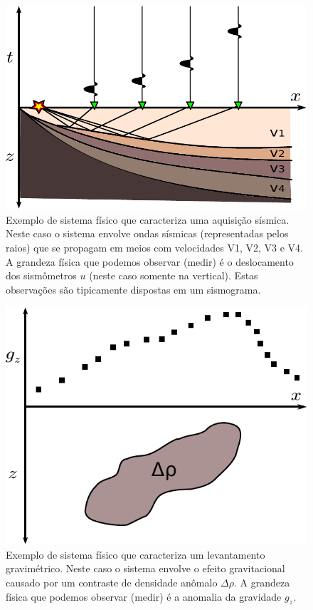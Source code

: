 \begin{figure}[b]
    \centering
    \includegraphics[scale=1]{figs/system-seismic}
    \caption{Exemplo de sistema físico que caracteriza uma aquisição sísmica.
        Neste caso o sistema envolve ondas sísmicas (representadas pelos raios)
        que se propagam em meios com velocidades V1, V2, V3 e V4.
        A grandeza física que podemos observar (medir)
        é o deslocamento dos sismômetros $u$ (neste caso somente na vertical).
        Estas observações são tipicamente dispostas em um sismograma.}
    \label{fig:system-seismic}
\end{figure}

\begin{figure}
    \centering
    \includegraphics[scale=1]{figs/system-grav}
    \caption{Exemplo de sistema físico que caracteriza um levantamento
        gravimétrico. Neste caso o sistema envolve o efeito gravitacional
        causado por um contraste de densidade anômalo $\Delta\rho$.
        A grandeza física que podemos observar (medir) é a anomalia da
        gravidade $g_z$.}
    \label{fig:system-grav}
\end{figure}

